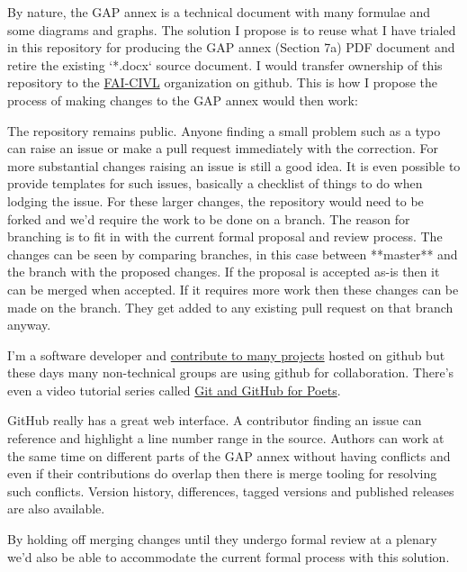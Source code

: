 \documentclass{article}
\begin{document}
By nature, the GAP annex is a technical document with many formulae and some
diagrams and graphs. The solution I propose is to reuse what I have trialed in
this repository for producing the GAP annex (Section 7a) PDF document and
retire the existing `*.docx` source document. I would transfer ownership of
this repository to the \href{https://github.com/FAI-CIVL}{FAI-CIVL}
organization on github. This is how I propose the process of making changes to
the GAP annex would then work:

The repository remains public. Anyone finding a small problem such as a typo
can raise an issue or make a pull request immediately with the correction. For
more substantial changes raising an issue is still a good idea. It is even
possible to provide templates for such issues, basically a checklist of things
to do when lodging the issue. For these larger changes, the repository would
need to be forked and we'd require the work to be done on a branch. The reason
for branching is to fit in with the current formal proposal and review process.
The changes can be seen by comparing branches, in this case between **master**
and the branch with the proposed changes. If the proposal is accepted as-is
then it can be merged when accepted. If it requires more work then these
changes can be made on the branch. They get added to any existing pull request
on that branch anyway.

I'm a software developer and \href{https://ghuser.io/philderbeast}{contribute
to many projects} hosted on github but these days many non-technical groups are
using github for collaboration.  There's even a video tutorial series called
\href{https://www.youtube.com/watch?v=BCQHnlnPusY&list=PLRqwX-V7Uu6ZF9C0YMKuns9sLDzK6zoiV}{Git and GitHub for Poets}.

GitHub really has a great web interface. A contributor finding an issue can
reference and highlight a line number range in the source. Authors can work at
the same time on different parts of the GAP annex without having conflicts and
even if their contributions do overlap then there is merge tooling for
resolving such conflicts.  Version history, differences, tagged versions and
published releases are also available.

By holding off merging changes until they undergo formal review at a plenary
we'd also be able to accommodate the current formal process with this solution.
\end{document}

